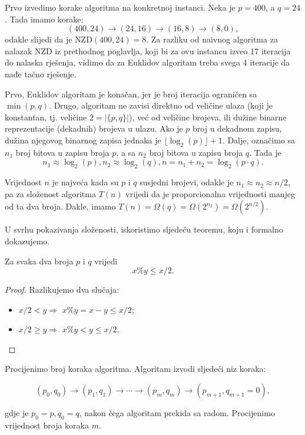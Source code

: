 \begin{example}
	Prvo izvedimo korake algoritma na konkretnoj instanci. Neka je $p=400$, a $q=24$. Tada imamo korake:
	$$(400, 24) \rightarrow (24, 16) \rightarrow (16, 8) \rightarrow (8, 0),$$
	odakle slijedi da je NZD$(400, 24)=8$. Za razliku od naivnog algoritma za nalazak NZD iz prethodnog poglavlja, koji bi za ovu instancu izveo 17 iteracija do nalaska rješenja, vidimo da za Euklidov algoritam treba svega 4 iteracije da nađe tačno rješenje. 
	
	Prvo, Euklidov algoritam je konačan, jer je broj iteracija ograničen sa $\min(p, q)$. Drugo, algoritam ne zavisi direktno od veličine ulaza (koji je konstantan, tj. veličine $2=|\{p, q\}|$), već od veličine brojeva, ili dužine binarne reprezentacije (dekadnih) brojeva u ulazu. Ako je $p$ broj u dekadnom zapisu, dužina njegovog binarnog zapisa jednaka je $\lfloor \log_2(p) \rfloor+1$. Dalje, označimo sa $n_1$   broj bitova u zapisu broja $p$, a sa $n_2$  broj bitova u zapisu broja $q$. 
	Tada je
	$$n_1 \approx \log_2(p), n_2 \approx \log_2(q),  n = n_1 + n_2 = \log_2(p \cdot q ).$$
	
	Vrijednost $n$ je najveća kada su $p$ i $q$ susjedni brojevi, odakle je $ n_1 \approx n_2 \approx n/2$,  pa za složenost algoritma $T(n)$ vrijedi da je proporcionalna vrijednosti manjeg od
	ta dva broja.  
	Dakle, imamo $T(n)  = \Omega(q) = \Omega(2^{n_2}) =  \Omega(2^{n/2})$.
	
	U svrhu pokazivanja složenosti, iskoristimo sljedeću teoremu, koju i formalno dokazujemo. 
	\begin{theorem}
		 Za svaka dva broja $p$ i $q$ vrijedi
		 $$ x \% y \leq x / 2.$$
	\end{theorem}
	 
	 \begin{proof}
	 	Razlikujemo dva slučaja:
	 	\begin{itemize}
	 		\item $x/2 < y \Rightarrow$  $x\%y = x  - y  \leq x/2 $;
            \item $x/2 \geq  y\Rightarrow$ $x\% y < y \leq x / 2$.
	 	\end{itemize}
	 \end{proof}
	
Procijenimo broj koraka algoritma. Algoritam izvodi sljedeći niz koraka:

$$(p_0,  q_0 ) \rightarrow (p_1, q_1) \rightarrow \cdots \rightarrow (p_m,q_m ) \rightarrow (p_{m+1}, q_{m+1}=0),$$	
	
	gdje je $p_0 = p, q_0 = q$, nakon čega algoritam prekida sa radom. Procijenimo vrijednost broja koraka $m$. 
	

\end{example}
